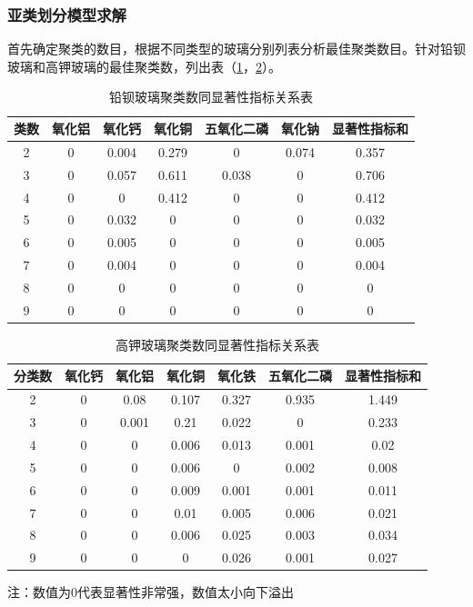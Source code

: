 \documentclass{my_paper}
\begin{document}
\subsubsection{亚类划分模型求解}
首先确定聚类的数目，根据不同类型的玻璃分别列表分析最佳聚类数目。针对铅钡玻璃和高钾玻璃的最佳聚类数，列出表（\ref{kb}，\ref{kk}）。
\begin{longtable}{ccccccc}
\caption{铅钡玻璃聚类数同显著性指标关系表}
\label{kb} \\
\toprule
类数 & 氧化铝 & 氧化钙   & 氧化铜   & 五氧化二磷 & 氧化钠   & 显著性指标和 \\\midrule
2  & 0   & 0.004 & 0.279 & 0     & 0.074 & 0.357  \\
3  & 0   & 0.057 & 0.611 & 0.038 & 0     & 0.706  \\
4  & 0   & 0     & 0.412 & 0     & 0     & 0.412  \\
5  & 0   & 0.032 & 0     & 0     & 0     & 0.032  \\
6  & 0   & 0.005 & 0     & 0     & 0     & 0.005  \\
7  & 0   & 0.004 & 0     & 0     & 0     & 0.004  \\
8  & 0   & 0     & 0     & 0     & 0     & 0      \\
9  & 0   & 0     & 0     & 0     & 0     & 0      \\
\bottomrule
\end{longtable}  

\begin{longtable}{ccccccc}
  \caption{高钾玻璃聚类数同显著性指标关系表}
  \label{kk} \\
  \toprule
  分类数 & 氧化钙 & 氧化铝   & 氧化铜   & 氧化铁   & 五氧化二磷 & 显著性指标和 \\\midrule
2   & 0   & 0.08  & 0.107 & 0.327 & 0.935 & 1.449  \\
3   & 0   & 0.001 & 0.21  & 0.022 & 0     & 0.233  \\
4   & 0   & 0     & 0.006 & 0.013 & 0.001 & 0.02   \\
5   & 0   & 0     & 0.006 & 0     & 0.002 & 0.008  \\
6   & 0   & 0     & 0.009 & 0.001 & 0.001 & 0.011  \\
7   & 0   & 0     & 0.01  & 0.005 & 0.006 & 0.021  \\
8   & 0   & 0     & 0.006 & 0.025 & 0.003 & 0.034  \\
9   & 0   & 0     & 0     & 0.026 & 0.001 & 0.027  \\
  \bottomrule
  \end{longtable}  
\begin{center}
  注：数值为0代表显著性非常强，数值太小向下溢出
\end{center}
\end{document}
